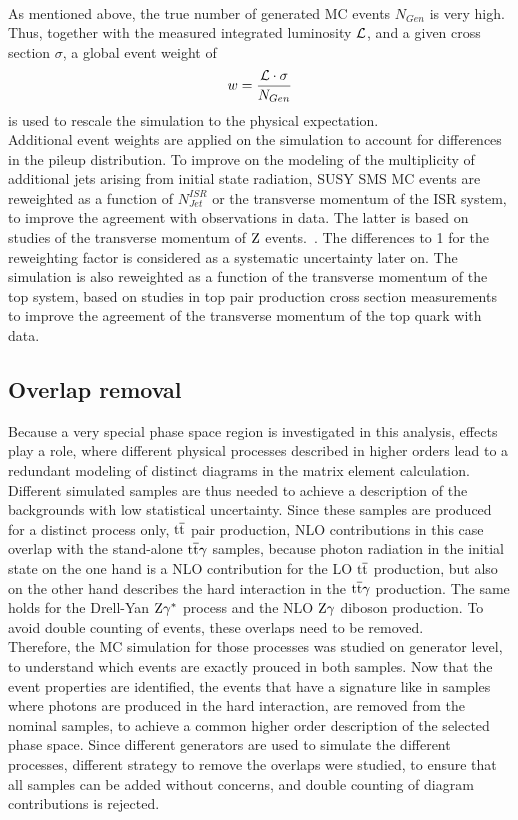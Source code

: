 \\
As mentioned above, the true number of generated MC events $N_{Gen}$ is very high. Thus, together with the measured integrated luminosity $\mathcal{L}$, and a given cross section $\sigma$, a global event weight of
\begin{equation}
 w = \frac{\mathcal{L} \cdot \sigma}{N_{Gen}}
\end{equation}
is used to rescale the simulation to the physical expectation.\\
Additional event weights are applied on the simulation to account for differences in the pileup distribution. To improve on the \MADGRAPH modeling of the multiplicity of additional jets arising from initial state radiation, SUSY SMS MC events are reweighted as a function of $N^{ISR}_{Jet}$ or the transverse momentum of the ISR system, to improve the agreement with observations in data.
The latter is based on studies of the transverse momentum of $\mathrm{Z}$ events.~\cite{NISRweight}.
The differences to 1 for the reweighting factor is considered as a systematic uncertainty later on.
The \POWHEG \ttbar simulation is also reweighted as a function of the transverse momentum of the top system, based on studies in top pair production cross section measurements~\cite{topWeight1,topWeight2,topWeight3,topWeight4} to improve the agreement of the transverse momentum of the top quark with data.

\subsection*{Overlap removal}\label{sec:overlap}

Because a very special phase space region is investigated in this analysis, effects play a role, where different physical processes described in higher orders lead to a redundant modeling of distinct diagrams in the matrix element calculation. Different simulated samples are thus needed to achieve a description of the backgrounds with low statistical uncertainty. Since these samples are produced for a distinct process only, \eg ${\mathrm{t}\overline{\mathrm{t}}}$ pair production, NLO contributions in this case overlap with the stand-alone ${\mathrm{t}\overline{\mathrm{t}}}\gamma$ samples, because photon radiation in the initial state on the one hand is a NLO contribution for the LO ${\mathrm{t}\overline{\mathrm{t}}}$ production, but also on the other hand describes the hard interaction in the ${\mathrm{t}\overline{\mathrm{t}}}\gamma$ production. The same holds for the Drell-Yan $\mathrm{Z}\gamma^{*}$ process and the NLO $\mathrm{Z}\gamma$ diboson production. To avoid double counting of events, these overlaps need to be removed.\\
Therefore, the MC simulation for those processes was studied on generator level, to understand which events are exactly prouced in both samples. Now that the event properties are identified, the events that have a signature like in samples where photons are produced in the hard interaction, are removed from the nominal samples, to achieve a common higher order description of the selected phase space. Since different generators are used to simulate the different processes, different strategy to remove the overlaps were studied, to ensure that all samples can be added without concerns, and double counting of diagram contributions is rejected.


